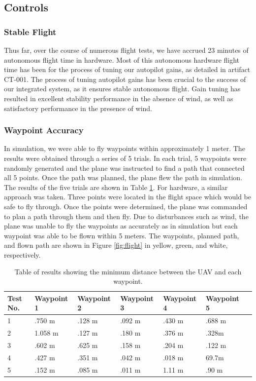 \documentclass[]{auvsi_doc}
\begin{document}
\subsection{Controls}

\subsubsection{Stable Flight}

Thus far, over the course of numerous flight tests, we have accrued 23 minutes of autonomous flight time in hardware. Most of this autonomous hardware flight time has been for the process of tuning our autopilot gains, as detailed in artifact CT-001. The process of tuning autopilot gains has been crucial to the success of our integrated system, as it ensures stable autonomous flight. Gain tuning has resulted in excellent stability performance in the absence of wind, as well as satisfactory performance in the presence of wind.

\subsubsection{Waypoint Accuracy}

In simulation, we were able to fly waypoints within approximately 1 meter. The results were obtained through a series of 5 trials. In each trial, 5 waypoints were randomly generated and the plane was instructed to find a path that connected all 5 points. Once the path was planned, the plane flew the path in simulation. The results of the five trials are shown in Table \ref{tab:con_res}. For hardware, a similar approach was taken. Three points were located in the flight space which would be safe to fly through. Once the points were determined, the plane was commanded to plan a path through them and then fly. Due to disturbances such as wind, the plane was unable to fly the waypoints as accurately as in simulation but each waypoint was able to be flown within 5 meters. The waypoints, planned path, and flown path are shown in Figure \ref{fig:flight} in yellow, green, and white, respectively.

\begin{table}[h!]

\caption{Table of results showing the minimum distance between the UAV and each waypoint.}
\label{tab:con_res}
\begin{tabular} {|l|l|l|l|l|l|l|}
\hline
Test No. & Waypoint 1&Waypoint 2&Waypoint 3&Waypoint 4&Waypoint 5\\
\hline
1 & .750 m& .128 m& .092 m& .430 m& .688 m \\
2 & 1.058 m &.127 m & .180 m & .376 m & .328m \\
3& .602 m& .625 m&.158 m& .204 m& .122 m\\
4& .427 m & .351 m & .042 m & .018 m& 69.7m\\
5& .152 m& .085 m& .011 m & 1.11 m & .90 m\\
\hline
\end{tabular}
\end{table}
\end{document}
